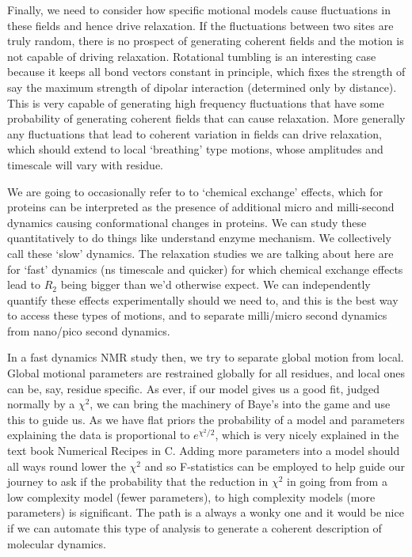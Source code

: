 \documentclass[showkeys,aps,prb,prepreint,amssymb, amsmath,nobibnotes]{article}
\begin{document}
  Finally, we need to consider how specific motional models cause fluctuations in these fields and hence drive relaxation. If the fluctuations between two sites are truly random, there is no prospect of generating coherent fields and the motion is not capable of driving relaxation. Rotational tumbling is an interesting case because it keeps all bond vectors constant in principle, which fixes the strength of say the maximum strength of dipolar interaction (determined only by distance). This is very capable of generating high frequency fluctuations that have some probability of generating coherent fields that can cause relaxation. More generally any fluctuations that lead to coherent variation in fields can drive relaxation, which should extend to local `breathing' type motions, whose amplitudes and timescale will vary with residue.

  We are going to occasionally refer to to `chemical exchange' effects, which for proteins can be interpreted as the presence of additional micro and milli-second dynamics causing conformational changes in proteins. We can study these quantitatively to do things like understand enzyme mechanism. We collectively call these `slow' dynamics. The relaxation studies we are talking about here are for `fast' dynamics (ns timescale and quicker) for which chemical exchange effects lead to $R_2$ being bigger than we'd otherwise expect. We can independently quantify these effects experimentally should we need to, and this is the best way to access these types of motions, and to separate milli/micro second dynamics from nano/pico second dynamics.
  
  In a fast dynamics NMR study then, we try to separate global motion from local. Global motional parameters are restrained globally for all residues, and local ones can be, say, residue specific. As ever, if our model gives us a good fit, judged normally by a $\chi^2$, we can bring the machinery of Baye's into the game and use this to guide us. As we have flat priors the probability of a model and parameters explaining the data is proportional to $e^{\chi^2/2}$, which is very nicely explained in the text book Numerical Recipes in C. Adding more parameters into a model should all ways round lower the $\chi^2$ and so F-statistics can be employed to help guide our journey to ask if the probability that the reduction in $\chi^2$ in going from from a low complexity model (fewer parameters), to high complexity models (more parameters) is significant. The path is a always a wonky one and it would be nice if we can automate this type of analysis to generate a coherent description of molecular dynamics.
\end{document}
